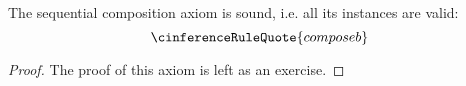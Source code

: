 \documentclass[11pt,twoside]{scrartcl}
\begin{document}

\begin{theorem}
  The sequential composition axiom  is sound, i.e. all its instances are valid:
  \[
  \cinferenceRuleQuote{composeb}
  \]
\end{theorem}
\begin{proof}
The proof of this axiom is left as an exercise.
\end{proof}
\end{document}

